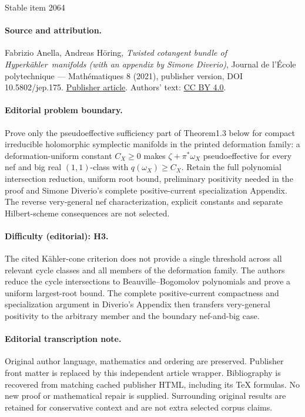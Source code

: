 \documentclass[11pt]{article}
\theoremstyle{plain}
\theoremstyle{definition}
\begin{document}
\begin{center}{\Large Stable item 2064}\end{center}
\paragraph{Source and attribution.}
Fabrizio Anella, Andreas Höring, \emph{Twisted cotangent bundle of Hyperkähler manifolds  (with an appendix by Simone Diverio)}, Journal de l’École polytechnique — Mathématiques 8 (2021), publisher version, DOI 10.5802/jep.175. \href{https://jep.centre-mersenne.org/articles/10.5802/jep.175/}{Publisher article}. Authors' text: \href{https://creativecommons.org/licenses/by/4.0/}{CC BY 4.0}.
\paragraph{Editorial problem boundary.}
Prove only the pseudoeffective sufficiency part of Theorem1.3 below for compact irreducible holomorphic symplectic manifolds in the printed deformation family: a deformation-uniform constant \(C_X\ge0\) makes \(\zeta+\pi^*\omega_X\) pseudoeffective for every nef and big real \((1,1)\)-class with \(q(\omega_X)\ge C_X\). Retain the full polynomial intersection reduction, uniform root bound, preliminary positivity needed in the proof and Simone Diverio's complete positive-current specialization Appendix. The reverse very-general nef characterization, explicit constants and separate Hilbert-scheme consequences are not selected.
\paragraph{Difficulty (editorial): H3.}
The cited Kähler-cone criterion does not provide a single threshold across all relevant cycle classes and all members of the deformation family. The authors reduce the cycle intersections to Beauville--Bogomolov polynomials and prove a uniform largest-root bound. The complete positive-current compactness and specialization argument in Diverio's Appendix then transfers very-general positivity to the arbitrary member and the boundary nef-and-big case.
\paragraph{Editorial transcription note.}
Original author language, mathematics and ordering are preserved. Publisher front matter is replaced by this independent article wrapper. Bibliography is recovered from matching cached publisher HTML, including its TeX formulas. No new proof or mathematical repair is supplied. Surrounding original results are retained for conservative context and are not extra selected corpus claims.
\clearpage
\end{document}
